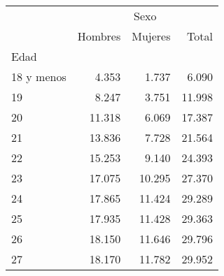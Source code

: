 \begin{tabular}{llll}
\cline{1-4}
\multicolumn{1}{c}{} &
  \multicolumn{3}{|c}{Sexo} \\
\multicolumn{1}{c}{} &
  \multicolumn{1}{|r}{Hombres} &
  \multicolumn{1}{r}{Mujeres} &
  \multicolumn{1}{r}{Total} \\
\cline{1-4}
\multicolumn{1}{l}{Edad} &
  \multicolumn{1}{|r}{} &
  \multicolumn{1}{r}{} &
  \multicolumn{1}{r}{} \\
\multicolumn{1}{l}{\hspace{1em}18 y menos} &
  \multicolumn{1}{|r}{4.353} &
  \multicolumn{1}{r}{1.737} &
  \multicolumn{1}{r}{6.090} \\
\multicolumn{1}{l}{\hspace{1em}19} &
  \multicolumn{1}{|r}{8.247} &
  \multicolumn{1}{r}{3.751} &
  \multicolumn{1}{r}{11.998} \\
\multicolumn{1}{l}{\hspace{1em}20} &
  \multicolumn{1}{|r}{11.318} &
  \multicolumn{1}{r}{6.069} &
  \multicolumn{1}{r}{17.387} \\
\multicolumn{1}{l}{\hspace{1em}21} &
  \multicolumn{1}{|r}{13.836} &
  \multicolumn{1}{r}{7.728} &
  \multicolumn{1}{r}{21.564} \\
\multicolumn{1}{l}{\hspace{1em}22} &
  \multicolumn{1}{|r}{15.253} &
  \multicolumn{1}{r}{9.140} &
  \multicolumn{1}{r}{24.393} \\
\multicolumn{1}{l}{\hspace{1em}23} &
  \multicolumn{1}{|r}{17.075} &
  \multicolumn{1}{r}{10.295} &
  \multicolumn{1}{r}{27.370} \\
\multicolumn{1}{l}{\hspace{1em}24} &
  \multicolumn{1}{|r}{17.865} &
  \multicolumn{1}{r}{11.424} &
  \multicolumn{1}{r}{29.289} \\
\multicolumn{1}{l}{\hspace{1em}25} &
  \multicolumn{1}{|r}{17.935} &
  \multicolumn{1}{r}{11.428} &
  \multicolumn{1}{r}{29.363} \\
\multicolumn{1}{l}{\hspace{1em}26} &
  \multicolumn{1}{|r}{18.150} &
  \multicolumn{1}{r}{11.646} &
  \multicolumn{1}{r}{29.796} \\
\multicolumn{1}{l}{\hspace{1em}27} &
  \multicolumn{1}{|r}{18.170} &
  \multicolumn{1}{r}{11.782} &
  \multicolumn{1}{r}{29.952} \\

\end{tabular}
